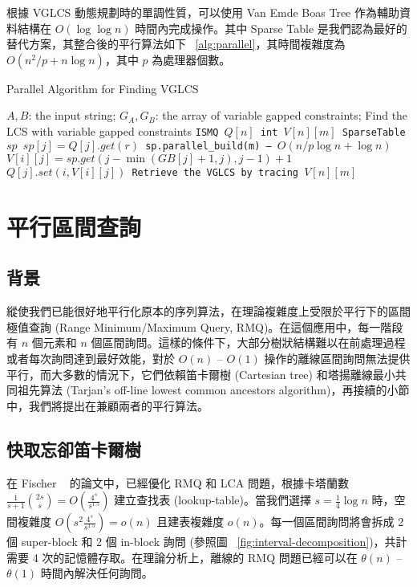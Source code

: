 \documentclass{gapd}
\begin{document}
根據 VGLCS 動態規劃時的單調性質，可以使用 Van Emde Boas Tree 作為輔助資料結構在 $O(\log \log n)$ 時間內完成操作。其中 Sparse Table 是我們認為最好的替代方案，其整合後的平行算法如下 ~\ref{alg:parallel}，其時間複雜度為 $O(n^2 / p + n \log n)$，其中 $p$ 為處理器個數。

\begin{algorithm*}
  \caption{Parallel Algorithm for Finding VGLCS}
  \label{alg:parallel}
  \begin{algorithmic}[1]
    \Require
      $A, B$: the input string;
      $G_A, G_B$: the array of variable gapped constraints;
    \Ensure Find the LCS with variable gapped constraints
    \State \tt{ISMQ} $Q[n]$
    \State \tt{int} $V[n][m]$
      \State SparseTable $sp$
        \State $sp[j] = Q[j].get(r)$
      \EndParFor
      \State sp.parallel\_build(m) -- $O(n/p \log n + \log n)$
            \State $V[i][j] = sp.get(j - \min(GB[j]+1, j), j-1)+1$
            \State $Q[j].set(i, V[i][j])$
        \EndIf
      \EndParFor
    \EndFor
    \State Retrieve the VGLCS by tracing $V[n][m]$
  \end{algorithmic}
\end{algorithm*}

\section{平行區間查詢} %
\label{sec:parallelRMQ}

\subsection{背景}

縱使我們已能很好地平行化原本的序列算法，在理論複雜度上受限於平行下的區間極值查詢 (Range Minimum/Maximum Query, RMQ)。在這個應用中，每一階段有 $n$ 個元素和 $n$ 個區間詢問。這樣的條件下，大部分樹狀結構難以在前處理過程或者每次詢問達到最好效能，對於 $O(n)$ -- $O(1)$ 操作的離線區間詢問無法提供平行，而大多數的情況下，它們依賴笛卡爾樹 (Cartesian tree) 和塔揚離線最小共同祖先算法 (Tarjan's off-line lowest common ancestors algorithm)，再接續的小節中，我們將提出在兼顧兩者的平行算法。

\subsection{快取忘卻笛卡爾樹}

在 Fischer ~\cite{fischer} 的論文中，已經優化 RMQ 和 LCA 問題，根據卡塔蘭數 $\frac{1}{s+1}\binom{2s}{s} = O(\frac{4^s}{s^{1.5}})$ 建立查找表 (lookup-table)。當我們選擇 $s = \frac{1}{4} \log n$ 時，空間複雜度 $O(s^2 \frac{4^s}{s^{1.5}}) = o(n)$ 且建表複雜度 $o(n)$。每一個區間詢問將會拆成 2 個 super-block 和 2 個 in-block 詢問 (參照圖 ~\ref{fig:interval-decomposition})，共計需要 4 次的記憶體存取。在理論分析上，離線的 RMQ 問題已經可以在 $\theta(n)$ -- $\theta(1)$ 時間內解決任何詢問。
\end{document}
